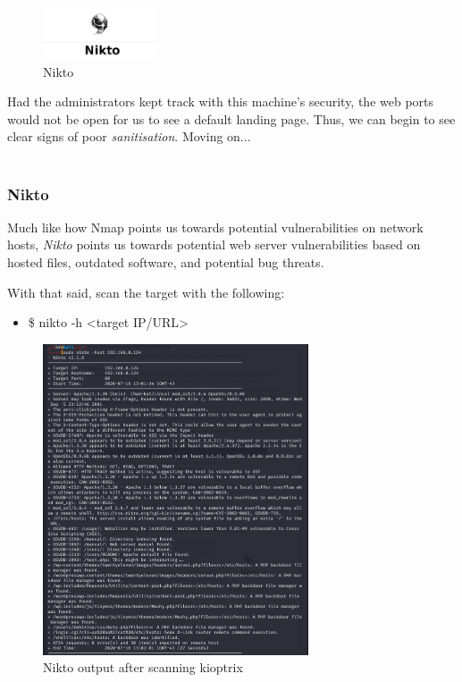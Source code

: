 \documentclass[a4paper,11pt]{article}
\renewcommand{\tt}[2][tt]{\textcolor{#1}{\ttfamily #2}}%
\begin{document}
\begin{figure}
  \begin{center}
    \includegraphics[width=0.3\textwidth]{images/nikto.jpg}
  \end{center}
  \caption{Nikto}
  \label{fig:nikto}
\end{figure}
Had the administrators kept track with this machine's security, the web ports would not be open for us to see a default landing page. Thus, we can begin to see clear signs of poor \textit{sanitisation}. Moving on...
\\
\\
\subsubsection{Nikto}
Much like how Nmap points us towards potential vulnerabilities on network hosts, \textit{Nikto} points us towards potential web server vulnerabilities based on hosted files, outdated software, and potential bug threats.
\pagebreak

With that said, scan the target with the following:
\begin{itemize}
    \item \tt{\$ nikto -h <target IP/URL>}
\end{itemize}

\begin{figure}[h]
    \centering
    \includegraphics[width=0.7\textwidth]{images/niktok1.png}
    \caption{Nikto output after scanning kioptrix}
    \label{fig:niktok1}
\end{figure}
\end{document}
